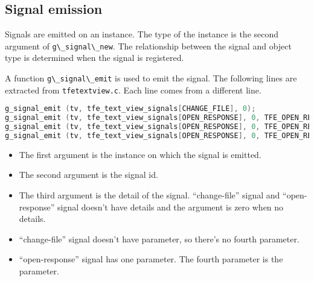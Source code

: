 \hypertarget{signal-emission}{%
\subsection{Signal emission}\label{signal-emission}}

Signals are emitted on an instance. The type of the instance is the
second argument of \passthrough{\lstinline!g\_signal\_new!}. The
relationship between the signal and object type is determined when the
signal is registered.

A function \passthrough{\lstinline!g\_signal\_emit!} is used to emit the
signal. The following lines are extracted from
\passthrough{\lstinline!tfetextview.c!}. Each line comes from a
different line.

\begin{lstlisting}[language=C]
g_signal_emit (tv, tfe_text_view_signals[CHANGE_FILE], 0);
g_signal_emit (tv, tfe_text_view_signals[OPEN_RESPONSE], 0, TFE_OPEN_RESPONSE_SUCCESS);
g_signal_emit (tv, tfe_text_view_signals[OPEN_RESPONSE], 0, TFE_OPEN_RESPONSE_CANCEL);
g_signal_emit (tv, tfe_text_view_signals[OPEN_RESPONSE], 0, TFE_OPEN_RESPONSE_ERROR);
\end{lstlisting}

\begin{itemize}
\tightlist
\item
  The first argument is the instance on which the signal is emitted.
\item
  The second argument is the signal id.
\item
  The third argument is the detail of the signal. ``change-file'' signal
  and ``open-response'' signal doesn't have details and the argument is
  zero when no details.
\item
  ``change-file'' signal doesn't have parameter, so there's no fourth
  parameter.
\item
  ``open-response'' signal has one parameter. The fourth parameter is
  the parameter.
\end{itemize}
